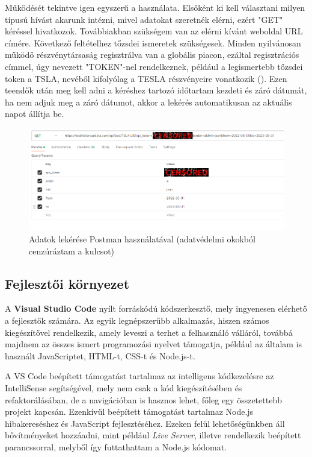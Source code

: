 	Működését tekintve igen egyszerű a használata. Elsőként ki kell választani milyen típusú hívást akarunk intézni, mivel adatokat szeretnék elérni, ezért "GET" kéréssel hivatkozok. Továbbiakban szükségem van az elérni kívánt weboldal URL címére. Következő feltételhez tőzsdei ismeretek szükségesek. Minden nyilvánosan működő részvénytársaság regisztrálva van a globális piacon, ezáltal regisztrációs címmel, úgy nevezett "TOKEN"-nel rendelkeznek, például a legismertebb tőzsdei token a TSLA, nevéből kifolyólag a TESLA részvényeire vonatkozik (). Ezen teendők után meg kell adni a kéréshez tartozó időtartam kezdeti és záró dátumát, ha nem adjuk meg a záró dátumot, akkor a lekérés automatikusan az aktuális napot állítja be. 

\begin{figure}[h]
\centering
\includegraphics[scale=0.5]{images/postman.png}
\caption{Adatok lekérése Postman használatával (adatvédelmi okokból cenzúráztam a kulcsot)}
\label{fig:postman}
\end{figure}

\pagebreak

\subsection{Fejlesztői környezet }

A \textbf{Visual Studio Code} nyílt forráskódú kódszerkesztő, mely ingyenesen elérhető a fejlesztők számára. Az egyik legnépszerűbb alkalmazás, hiszen számos kiegészítővel rendelkezik, amely leveszi a terhet a felhasználó válláról, továbbá majdnem az összes ismert programozási nyelvet támogatja, például az általam is használt JavaScriptet, HTML-t, CSS-t és Node.js-t. 

A VS Code beépített támogatást tartalmaz az intelligens kódkezelésre az IntelliSense segítségével, mely nem csak a kód kiegészítésében és refaktorálásában, de a navigációban is hasznos lehet, főleg egy összetettebb projekt kapcsán. Ezenkívül beépített támogatást tartalmaz Node.js hibakereséshez és JavaScript fejlesztéséhez. Ezeken felül lehetőségünkben áll bővítményeket hozzáadni, mint például \emph{Live Server}, illetve rendelkezik beépített parancssorral, melyből így futtathattam a Node.js kódomat. \cite{vsc}

